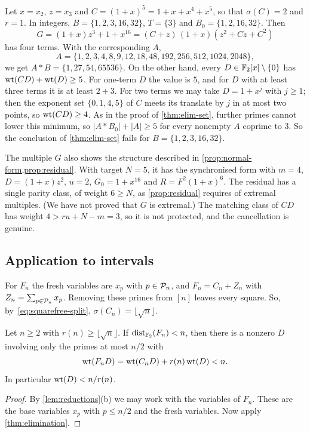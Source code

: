 \begin{example}\label{ex:sharp}
Let $x=x_2$, $z=x_3$ and $C=(1+x)^5=1+x+x^4+x^5$, so that $\sigma(C)=2$ and $r=1$. In integers, $B=\{1,2,3,16,32\}$, $T=\{3\}$ and $B_0=\{1,2,16,32\}$. Then
\[
 G=(1+x)z^3+1+x^{16}=(C+z)\,(1+x)(z^2+Cz+C^2)
\]
has four terms. With the corresponding $A$,
\[
 A=\{1,2,3,4,8,9,12,18,48,192,256,512,1024,2048\},
\]
we get $A*B=\{1,27,54,65536\}$. On the other hand, every $D\in\mathbb{F}_2[x]\setminus\{0\}$ has $\operatorname{wt}(CD)+\operatorname{wt}(D)\ge5$. For one-term $D$ the value is $5$, and for $D$ with at least three terms it is at least $2+3$. For two terms we may take $D=1+x^j$ with $j\ge1$; then the exponent set $\{0,1,4,5\}$ of $C$ meets its translate by $j$ in at most two points, so $\operatorname{wt}(CD)\ge4$. As in the proof of \cref{thm:elim-set}, further primes cannot lower this minimum, so $|A*B_0|+|A|\ge5$ for every nonempty $A$ coprime to $3$. So the conclusion of \cref{thm:elim-set} fails for $B=\{1,2,3,16,32\}$.

The multiple $G$ also shows the structure described in \cref{prop:normal-form,prop:residual}. With target $N=5$, it has the synchronised form with $m=4$, $D=(1+x)z^2$, $u=2$, $G_0=1+x^{16}$ and $R=F^2(1+x)^6$. The residual has a single parity class, of weight $6\ge N$, as \cref{prop:residual} requires of extremal multiples. (We have not proved that $G$ is extremal.) The matching class of $CD$ has weight $4>ru+N-m=3$, so it is not protected, and the cancellation is genuine.
\end{example}

\subsection{Application to intervals}
For $F_n$ the fresh variables are $x_p$ with $p\in\mathcal{P}_n$, and $F_n=C_n+Z_n$ with $Z_n=\sum_{p\in\mathcal{P}_n}x_p$. Removing these primes from $[n]$ leaves every square. So, by~\eqref{eq:squarefree-split}, $\sigma(C_n)=\lfloor\sqrt n\rfloor$.

\begin{corollary}\label{cor:interval-elim}
Let $n\ge2$ with $r(n)\ge\lfloor\sqrt n\rfloor$. If $\operatorname{dist}_{\mathbb{F}_2}(F_n)<n$, then there is a nonzero $D$ involving only the primes at most $n/2$ with
\[
 \operatorname{wt}(F_nD)=\operatorname{wt}(C_nD)+r(n)\operatorname{wt}(D)<n.
\]
In particular $\operatorname{wt}(D)<n/r(n)$.
\end{corollary}

\begin{proof}
By \cref{lem:reductions}(b) we may work with the variables of $F_n$. These are the base variables $x_p$ with $p\le n/2$ and the fresh variables. Now apply \cref{thm:elimination}.
\end{proof}

